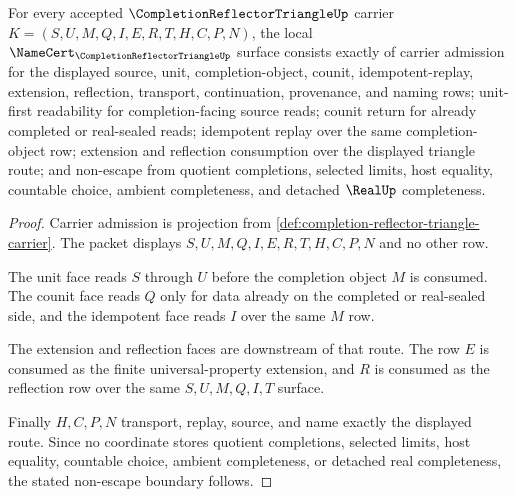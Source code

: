 \begin{theorem}
\label{thm:completion-reflector-triangle-namecert-obligations}
For every accepted $\CompletionReflectorTriangleUp$ carrier $K=(S,U,M,Q,I,E,R,T,H,C,P,N)$, the local $\NameCert_{\CompletionReflectorTriangleUp}$ surface consists exactly of carrier admission for the displayed source, unit, completion-object, counit, idempotent-replay, extension, reflection, transport, continuation, provenance, and naming rows; unit-first readability for completion-facing source reads; counit return for already completed or real-sealed reads; idempotent replay over the same completion-object row; extension and reflection consumption over the displayed triangle route; and non-escape from quotient completions, selected limits, host equality, countable choice, ambient completeness, and detached $\RealUp$ completeness.
\end{theorem}
\begin{proof}
Carrier admission is projection from \autoref{def:completion-reflector-triangle-carrier}. The packet displays $S,U,M,Q,I,E,R,T,H,C,P,N$ and no other row.

The unit face reads $S$ through $U$ before the completion object $M$ is consumed. The counit face reads $Q$ only for data already on the completed or real-sealed side, and the idempotent face reads $I$ over the same $M$ row.

The extension and reflection faces are downstream of that route. The row $E$ is consumed as the finite universal-property extension, and $R$ is consumed as the reflection row over the same $S,U,M,Q,I,T$ surface.

Finally $H,C,P,N$ transport, replay, source, and name exactly the displayed route. Since no coordinate stores quotient completions, selected limits, host equality, countable choice, ambient completeness, or detached real completeness, the stated non-escape boundary follows.
\end{proof}

